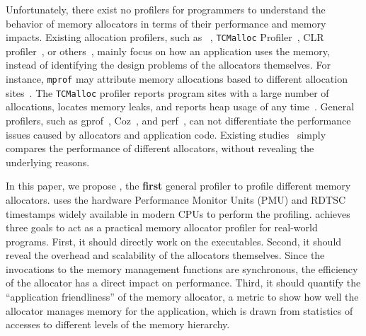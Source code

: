 Unfortunately, there exist no profilers for programmers to understand the behavior of memory allocators in terms of their performance and memory impacts. Existing allocation profilers, such as \MP{}~\cite{Zorn:1988:MAP:894814}, \texttt{TCMalloc} Profiler~\cite{tcmalloc-profiler}, CLR profiler~\cite{lupasc2014dynamic}, or others~\cite{hirotaka2003developing}, mainly focus on how an application uses the memory,  instead of identifying the design problems of the allocators themselves. For instance, \texttt{mprof} may attribute memory allocations based to different allocation sites~\cite{Zorn:1988:MAP:894814}. The \texttt{TCMalloc} profiler reports program sites with a large number of allocations, locates memory leaks, and reports heap usage of any time~\cite{tcmalloc-profiler}. General profilers, such as gprof~\cite{DBLP:conf/sigplan/GrahamKM82}, Coz~\cite{Coz}, and perf~\cite{perf}, can not differentiate the performance issues caused by allocators and application code. Existing studies~\cite{Barroso:1998:MSC:279358.279363, Masmano:2006:CMA:1167999.1168012, ferreira2011experimental} simply compares the performance of different allocators, without revealing the underlying reasons. 


In this paper, we propose \MP{}, the \textbf{first} general profiler to profile different memory allocators. \MP{} uses the hardware Performance Monitor Units (PMU) and RDTSC timestamps widely available in modern CPUs to perform the profiling. \MP{} achieves three goals to act as a practical memory allocator profiler for real-world programs. First, it should directly work on the executables. Second, it should reveal the overhead and scalability of the allocators themselves. Since the invocations to the memory management functions are synchronous, the efficiency of the allocator has a direct impact on performance. Third, it should quantify the ``application friendliness'' of the memory allocator, a metric to show how well the allocator manages memory for the application, which is drawn from statistics of accesses to different levels of the memory hierarchy.

